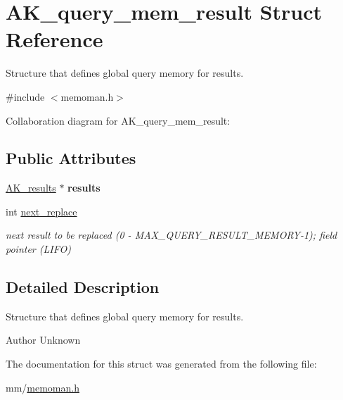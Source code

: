 \hypertarget{structAK__query__mem__result}{\section{A\+K\+\_\+query\+\_\+mem\+\_\+result Struct Reference}
\label{structAK__query__mem__result}
}


Structure that defines global query memory for results.  




{\ttfamily \#include $<$memoman.\+h$>$}



Collaboration diagram for A\+K\+\_\+query\+\_\+mem\+\_\+result\+:
\subsection*{Public Attributes}
\begin{DoxyCompactItemize}
\item 
\hypertarget{structAK__query__mem__result_a59c89a5943e4a8a49e58472142b42f21}{\hyperlink{structAK__results}{A\+K\+\_\+results} $\ast$ {\bfseries results}}\label{structAK__query__mem__result_a59c89a5943e4a8a49e58472142b42f21}

\item 
\hypertarget{structAK__query__mem__result_a444ac5bc8a61cc3da3aedb9c762666a3}{int \hyperlink{structAK__query__mem__result_a444ac5bc8a61cc3da3aedb9c762666a3}{next\+\_\+replace}}\label{structAK__query__mem__result_a444ac5bc8a61cc3da3aedb9c762666a3}

\begin{DoxyCompactList}\small\item\em next result to be replaced (0 -\/ M\+A\+X\+\_\+\+Q\+U\+E\+R\+Y\+\_\+\+R\+E\+S\+U\+L\+T\+\_\+\+M\+E\+M\+O\+R\+Y-\/1); field pointer (L\+I\+F\+O) \end{DoxyCompactList}\end{DoxyCompactItemize}


\subsection{Detailed Description}
Structure that defines global query memory for results. 

\begin{DoxyAuthor}{Author}
Unknown 
\end{DoxyAuthor}


The documentation for this struct was generated from the following file\+:\begin{DoxyCompactItemize}
\item 
mm/\hyperlink{memoman_8h}{memoman.\+h}\end{DoxyCompactItemize}

